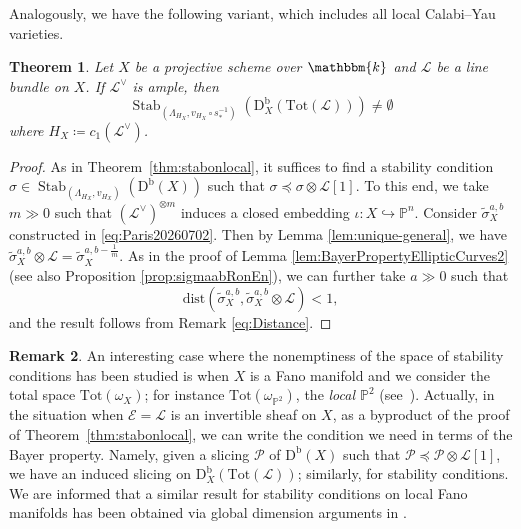 \documentclass[11pt, reqno]{amsart}
\numberwithin{equation}{section}
\theoremstyle{plain}
\newtheorem{theorem}{Theorem}[section]
\theoremstyle{remark}
\theoremstyle{definition}
\newtheorem{remark}[theorem]{Remark}
\theoremstyle{italicsname}
\newcommand{\Db}{\mathrm{D^b}}
\DeclareMathOperator{\Stab}{Stab}
\newcommand{\cE}{\mathcal{E}}
\newcommand{\cL}{\mathcal{L}}
\newcommand{\cP}{\mathscr{P}}
\newcommand{\KK}{\mathbbm{k}}
\def\PP{\ensuremath{\mathbb{P}}}
\begin{document}
Analogously, we have the following variant, which includes all local Calabi--Yau varieties.

\begin{theorem}\label{thm:local-cy}
Let $X$ be a projective scheme over $\KK$ and $\cL$ be a line bundle on $X$. 
If $\cL^{\vee}$ is ample, then
\[
\Stab_{(\Lambda_{H_X},v_{H_X}\circ s_*^{-1})}\left(\mathrm{D}_X^{\mathrm{b}}(\mathrm{Tot}(\cL))\right)\neq\emptyset
\]
where $H_X\coloneqq c_1(\cL^{\vee})$.
\end{theorem}

\begin{proof}
As in Theorem~\ref{thm:stabonlocal}, it suffices to find a stability condition $\sigma\in \Stab_{(\Lambda_{H_X},v_{H_X})}(\Db(X))$ such that $\sigma \preceq \sigma\otimes \cL[1]$. To this end, we take $m\gg 0$ such that $(\cL^{\vee})^{\otimes m}$ induces a closed embedding $\iota\colon X\hookrightarrow \PP^n$. Consider $\widetilde{\sigma}_X^{a,b}$ constructed in \eqref{eq:Paris20260702}. Then by Lemma \ref{lem:unique-general}, we have $\widetilde{\sigma}_X^{a,b}\otimes \cL=\widetilde{\sigma}_X^{a,b-\frac{1}{m}}$. As in the proof of Lemma \ref{lem:BayerPropertyEllipticCurves2} (see also Proposition \ref{prop:sigmaabRonEn}), we can further take $a\gg 0$ such that
\[
\mathrm{dist}(\widetilde{\sigma}_X^{a,b},\widetilde{\sigma}_X^{a,b}\otimes \cL)<1,
\]
and the result follows from Remark \ref{eq:Distance}.
\end{proof}

\begin{remark}
\label{remark-inducing-TotL}
An interesting case where the nonemptiness of the space of stability conditions has been studied is when $X$ is a Fano manifold and we consider the total space $\mathrm{Tot}(\omega_X)$; for instance $\mathrm{Tot}(\omega_{\PP^2})$, the \emph{local $\PP^2$} (see~\cite{BMLocalP2}).
Actually, in the situation when $\cE=\cL$ is an invertible sheaf on $X$, as a byproduct of the proof of Theorem~\ref{thm:stabonlocal}, we can write the condition we need in terms of the Bayer property.
Namely, given a slicing $\cP$ of $\Db(X)$ such that $\cP\preceq\cP\otimes\cL[1]$, we have an induced slicing on $\mathrm{D}^\mathrm{b}_X(\mathrm{Tot}(\cL))$; similarly, for stability conditions. We are informed that a similar result for stability conditions on local Fano manifolds has been obtained via global dimension arguments in \cite{WuZhang:LocalFano}.
\end{remark} 

\end{document}
